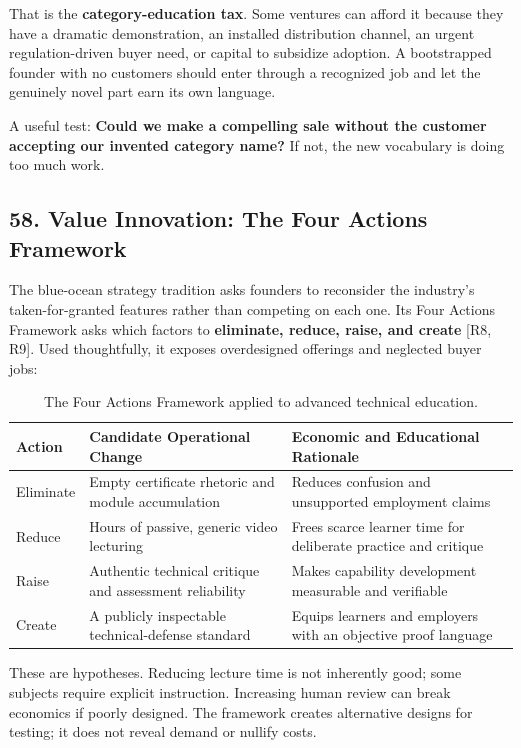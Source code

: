 That is the \textbf{category-education tax}. Some ventures can afford it because they have a dramatic demonstration, an installed distribution channel, an urgent regulation-driven buyer need, or capital to subsidize adoption. A bootstrapped founder with no customers should enter through a recognized job and let the genuinely novel part earn its own language.

A useful test: \textbf{Could we make a compelling sale without the customer accepting our invented category name?} If not, the new vocabulary is doing too much work.

\subsection*{58. Value Innovation: The Four Actions Framework}

The blue-ocean strategy tradition asks founders to reconsider the industry's taken-for-granted features rather than competing on each one. Its Four Actions Framework asks which factors to \textbf{eliminate, reduce, raise, and create} [R8, R9]. Used thoughtfully, it exposes overdesigned offerings and neglected buyer jobs:

\begin{table}[t]
\centering
\small
\begin{tabularx}{\textwidth}{>{\raggedright\arraybackslash}p{2.8cm} >{\raggedright\arraybackslash}p{5.5cm} >{\raggedright\arraybackslash}X}
\toprule
\textbf{Action} & \textbf{Candidate Operational Change} & \textbf{Economic and Educational Rationale} \\
\midrule
Eliminate & Empty certificate rhetoric and module accumulation & Reduces confusion and unsupported employment claims \\
Reduce & Hours of passive, generic video lecturing & Frees scarce learner time for deliberate practice and critique \\
Raise & Authentic technical critique and assessment reliability & Makes capability development measurable and verifiable \\
Create & A publicly inspectable technical-defense standard & Equips learners and employers with an objective proof language \\
\bottomrule
\end{tabularx}
\caption{The Four Actions Framework applied to advanced technical education.}
\label{tab:ch8-four-actions}
\end{table}

These are hypotheses. Reducing lecture time is not inherently good; some subjects require explicit instruction. Increasing human review can break economics if poorly designed. The framework creates alternative designs for testing; it does not reveal demand or nullify costs.

